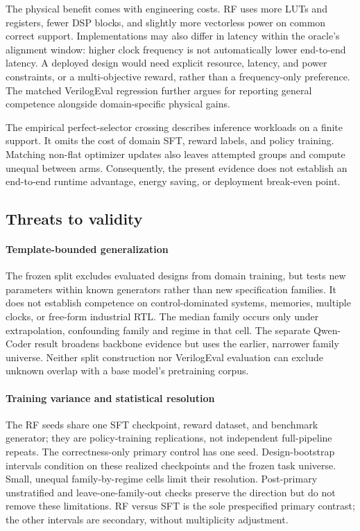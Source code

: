 The physical benefit comes with engineering costs.  RF uses more LUTs and
registers, fewer DSP blocks, and slightly more vectorless power on common
correct support.  Implementations may also differ in latency within the
oracle's alignment window: higher clock frequency is not automatically lower
end-to-end latency.  A deployed design would need explicit resource, latency,
and power constraints, or a multi-objective reward, rather than a frequency-only
preference.  The matched VerilogEval regression further argues for reporting
general competence alongside domain-specific physical gains.

The empirical perfect-selector crossing describes inference workloads on a
finite support.  It omits the cost of domain SFT, reward labels, and policy
training.  Matching non-flat optimizer updates also leaves attempted groups
and compute unequal between arms.  Consequently, the present evidence does not
establish an end-to-end runtime advantage, energy saving, or deployment
break-even point.

\subsection{Threats to validity}

\paragraph{Template-bounded generalization}
The frozen split excludes evaluated designs from domain training, but tests
new parameters within known generators rather than new specification families.
It does not establish competence on control-dominated systems, memories,
multiple clocks, or free-form industrial RTL.  The median family occurs only
under extrapolation, confounding family and regime in that cell.  The separate
Qwen-Coder result broadens backbone evidence but uses the earlier, narrower
family universe.  Neither split construction nor VerilogEval evaluation can
exclude unknown overlap with a base model's pretraining corpus.

\paragraph{Training variance and statistical resolution}
The RF seeds share one SFT checkpoint, reward dataset, and benchmark generator;
they are policy-training replications, not independent full-pipeline repeats.
The correctness-only primary control has one seed.  Design-bootstrap intervals
condition on these realized checkpoints and the frozen task universe.  Small,
unequal family-by-regime cells limit their resolution.  Post-primary
unstratified and leave-one-family-out checks preserve the direction but do not
remove these limitations.  RF versus SFT is the sole prespecified primary
contrast; the other intervals are secondary, without multiplicity adjustment.

